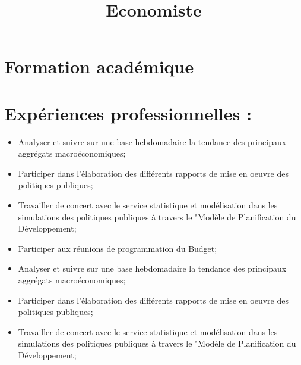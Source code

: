 \documentclass[11pt,a4paper,roman]{moderncv}
\title{Economiste}
\begin{document}
\maketitle
\section{Formation acad\'{e}mique}
\section{Exp\'{e}riences professionnelles :}
{
	\begin{itemize}%
		\item  Analyser et suivre sur une base hebdomadaire  la tendance des principaux aggr\'{e}gats macro\'{e}conomiques;
		\item Participer dans l'\'{e}laboration des diff\'{e}rents rapports de mise en oeuvre des politiques publiques;
		\item Travailler de concert avec le service statistique et mod\'{e}lisation dans les simulations des politiques publiques \`{a} travers le "Mod\`{e}le de Planification du D\'{e}veloppement;
		\item Participer aux r\'{e}unions de programmation du Budget;
\end{itemize}}

{
	\begin{itemize}%
		\item  Analyser et suivre sur une base hebdomadaire  la tendance des principaux aggr\'{e}gats macro\'{e}conomiques;
		\item Participer dans l'\'{e}laboration des diff\'{e}rents rapports de mise en oeuvre des politiques publiques;
		\item Travailler de concert avec le service statistique et mod\'{e}lisation dans les simulations des politiques publiques \`{a} travers le "Mod\`{e}le de Planification du D\'{e}veloppement;
\end{itemize}}
\end{document}
